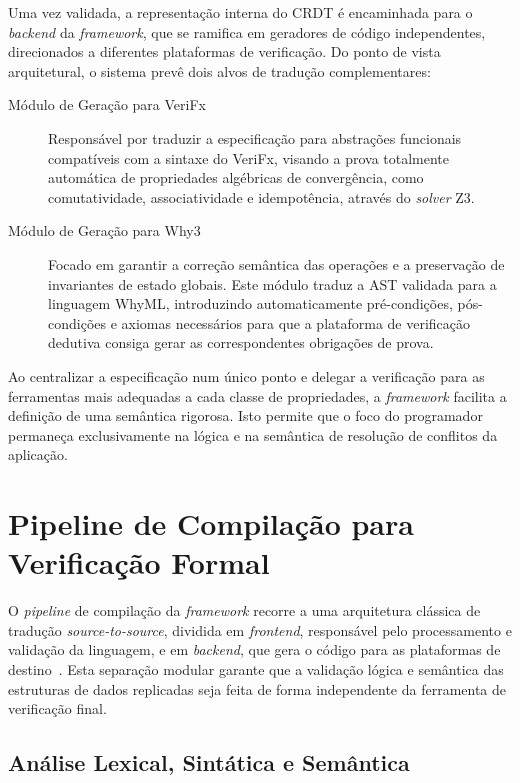 \documentclass{llncs}
\begin{document}
Uma vez validada, a representação interna do CRDT é encaminhada para o \textit{backend} da \textit{framework},
que se ramifica em geradores de código independentes, direcionados a diferentes plataformas de verificação.
Do ponto de vista arquitetural, o sistema prevê dois alvos de tradução complementares:

\begin{description}
    \item[Módulo de Geração para VeriFx] Responsável por traduzir a especificação para abstrações funcionais compatíveis com a sintaxe do VeriFx,
    visando a prova totalmente automática de propriedades algébricas de convergência, como comutatividade, associatividade e idempotência, através do \textit{solver} Z3. \\
    \item[Módulo de Geração para Why3] Focado em garantir a correção semântica das operações e a preservação de invariantes de estado globais.
    Este módulo traduz a AST validada para a linguagem WhyML, introduzindo automaticamente pré-condições,
    pós-condições e axiomas necessários para que a plataforma de verificação dedutiva consiga gerar as correspondentes obrigações de prova.
\end{description}

Ao centralizar a especificação num único ponto e delegar a verificação para as ferramentas mais adequadas a cada classe de propriedades,
a \textit{framework} facilita a definição de uma semântica rigorosa.
Isto permite que o foco do programador permaneça exclusivamente na lógica e na semântica de resolução de conflitos da aplicação.

\section{Pipeline de Compilação para Verificação Formal}

O \textit{pipeline} de compilação da \textit{framework} recorre a uma arquitetura clássica de tradução \textit{source-to-source},
dividida em \textit{frontend}, responsável pelo processamento e validação da linguagem, e em \textit{backend},
que gera o código para as plataformas de destino~\cite{porre2023masses,why3}. Esta separação modular garante que a validação lógica e
semântica das estruturas de dados replicadas seja feita de forma independente da ferramenta de verificação final.

\subsection{Análise Lexical, Sintática e Semântica}
\end{document}

